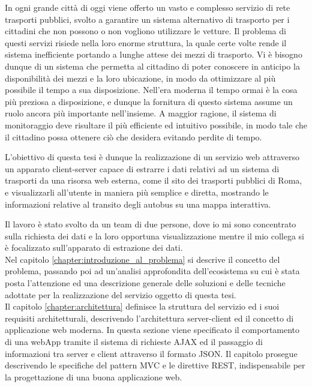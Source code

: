 %
In ogni grande città di oggi viene offerto un vasto e complesso servizio di rete trasporti pubblici, svolto a garantire un sistema alternativo di trasporto per i cittadini che non possono o non vogliono utilizzare le vetture. Il problema di questi servizi risiede nella loro enorme struttura, la quale certe volte rende il sistema inefficiente portando a lunghe attese dei mezzi di trasporto. Vi è bisogno dunque di un sistema che permetta al cittadino di poter conoscere in anticipo la disponibilità dei mezzi e la loro ubicazione, in modo da ottimizzare al più possibile il tempo a sua disposizione. Nell'era moderna il tempo ormai è la cosa più preziosa a disposizione, e dunque la fornitura di questo sistema assume un ruolo ancora più importante nell'insieme. A maggior ragione, il sistema di monitoraggio deve risultare il più efficiente ed intuitivo possibile, in modo tale che il cittadino possa ottenere ciò che desidera evitando perdite di tempo.

L'obiettivo di questa tesi è dunque la realizzazione di un servizio web attraverso un apparato client-server capace di estrarre i dati relativi ad un sistema di trasporti da una risorsa web esterna, come il sito dei trasporti pubblici di Roma, e visualizzarli all'utente in maniera più semplice e diretta, mostrando le informazioni relative al transito degli autobus su una mappa interattiva.

Il lavoro è stato svolto da un team di due persone, dove io mi sono concentrato sulla richiesta dei dati e la loro opportuna visualizzazione mentre il mio collega si è focalizzato sull'apparato di estrazione dei dati.\\

Nel capitolo \ref{chapter:introduzione_al_problema} si descrive il concetto del problema, passando poi ad un'analisi approfondita dell'ecosistema su cui è stata posta l'attenzione ed una descrizione generale delle soluzioni e delle tecniche adottate per la realizzazione del servizio oggetto di questa tesi.\\

Il capitolo \ref{chapter:architettura} definisce la struttura del servizio ed i suoi requisiti architetturali, descrivendo l'architettura server-client ed il concetto di applicazione web moderna. In questa sezione viene specificato il comportamento di una webApp tramite il sistema di richieste AJAX ed il passaggio di informazioni tra server e client attraverso il formato JSON. Il capitolo prosegue descrivendo le specifiche del pattern MVC e le direttive REST, indispensabile per la progettazione di una buona applicazione web.\\

